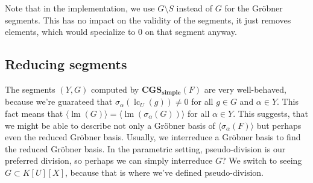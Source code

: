 \documentclass[a4paper, 12pt]{article}
\DeclareMathOperator{\LM}{lm}
\DeclareMathOperator{\LC}{lc}
\theoremstyle{changedot}
\theoremstyle{changedotbreak}
\theoremstyle{nonumberplain}
\begin{document}
Note that in the implementation, we use $G \setminus S$ instead of $G$ for the Gröbner segments. This has no impact on the validity of the segments, it just removes elements, which would specialize to 0 on that segment anyway.

\subsection{Reducing segments}
The segments $(Y, G)$ computed by $\mathbf{CGS_{simple}}(F)$ are very well-behaved, because we're guarateed that $\sigma_{\alpha}(\LC_{U}(g)) \neq 0$ for all $g \in G$ and $\alpha \in Y$. This fact means that $\langle \LM(G) \rangle = \langle \LM(\sigma_{\alpha}(G)) \rangle$ for all $\alpha \in Y$. This suggests, that we might be able to describe not only a Gröbner basis of $\langle \sigma_{\alpha}(F) \rangle$ but perhaps even the reduced Gröbner basis. Usually, we interreduce a Gröbner basis to find the reduced Gröbner basis. In the parametric setting, pseudo-division is our preferred division, so perhaps we can simply interreduce $G$? We switch to seeing $G \subset K[U][X]$, because that is where we've defined pseudo-division.
\end{document}
